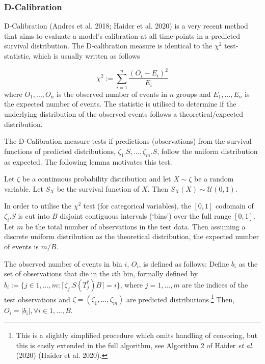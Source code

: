 \documentclass[
  letterpaper,
]{scrbook}
\theoremstyle{plain}
\theoremstyle{definition}
\theoremstyle{remark}
\begin{document}
\hypertarget{d-calibration}{%
\subsubsection{D-Calibration}\label{d-calibration}}

D-Calibration (Andres et al. 2018; Haider et al. 2020) is a very recent
method that aims to evaluate a model's calibration at all time-points in
a predicted survival distribution. The D-calibration measure is
identical to the \(\chi^2\) test-statistic, which is usually written as
follows

\[
\chi^2 := \sum_{i=1}^n \frac{(O_i - E_i)^2}{E_i}
\] where \(O_1,...,O_n\) is the observed number of events in \(n\)
groups and \(E_1,...,E_n\) is the expected number of events. The
statistic is utilised to determine if the underlying distribution of the
observed events follows a theoretical/expected distribution.

The D-Calibration measure tests if predictions (observations) from the
survival functions of predicted distributions,
\(\zeta_1.S,...,\zeta_m.S\), follow the uniform distribution as
expected. The following lemma motivates this test.

\leavevmode{}%
\label{lem:uniform_surv} Let \(\zeta\) be a continuous probability
distribution and let \(X \sim \zeta\) be a random variable. Let \(S_X\)
be the survival function of \(X\). Then
\(S_X(X) \sim \mathcal{U}(0, 1)\).

In order to utilise the \(\chi^2\) test (for categorical variables), the
\([0,1]\) codomain of \(\zeta_i.S\) is cut into \(B\) disjoint
contiguous intervals (`bins') over the full range \([0,1]\). Let \(m\)
be the total number of observations in the test data. Then assuming a
discrete uniform distribution as the theoretical distribution, the
expected number of events is \(m/B\).

The observed number of events in bin \(i\), \(O_i\), is defined as
follows: Define \(b_i\) as the set of observations that die in the
\(i\)th bin, formally defined by
\(b_i := \{j \in 1,...,m : \lceil \zeta_j.S(T^*_j)B \rceil = i\}\),
where \(j = 1,...,m\) are the indices of the test observations and
\(\zeta = (\zeta_1,...,\zeta_m)\) are predicted
distributions.\footnote{This is a slightly simplified procedure which
  omits handling of censoring, but this is easily extended in the full
  algorithm, see Algorithm 2 of Haider \textit{et al.} (2020) (Haider et
  al. 2020).} Then, \(O_i = |b_i|, \forall i \in 1,...,B\).
\end{document}
